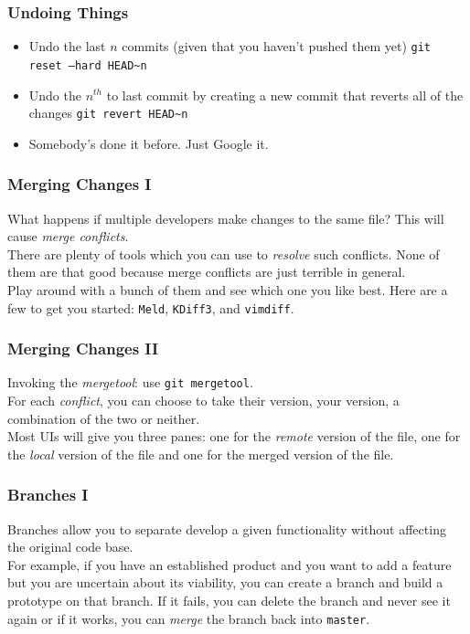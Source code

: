 \documentclass{lug}
\begin{document}
\begin{frame}
    \frametitle{Undoing Things}

    \begin{itemize}
        \item Undo the last $n$ commits (given that you haven't pushed them yet)
            \texttt{git reset --hard HEAD\textasciitilde n}
        \item Undo the $n^{th}$ to last commit by creating a new commit that
            reverts all of the changes \texttt{git revert HEAD\textasciitilde n}
        \item Somebody's done it before. Just Google it.
    \end{itemize}
\end{frame}

\begin{frame}
    \frametitle{Merging Changes I}

    What happens if multiple developers make changes to the same file? This will
    cause \textit{merge conflicts}.\\

    There are plenty of tools which you can use to \textit{resolve} such
    conflicts. None of them are that good because merge conflicts are just
    terrible in general.\\

    Play around with a bunch of them and see which one you like best. Here are a
    few to get you started: \texttt{Meld}, \texttt{KDiff3}, and
    \texttt{vimdiff}.\\
\end{frame}

\begin{frame}
    \frametitle{Merging Changes II}

    Invoking the \textit{mergetool}: use \texttt{git mergetool}.\\

    For each \textit{conflict}, you can choose to take their version, your
    version, a combination of the two or neither.\\

    Most UIs will give you three panes: one for the \textit{remote} version of
    the file, one for the \textit{local} version of the file and one for the
    merged version of the file.

\end{frame}

\begin{frame}
    \frametitle{Branches I}

    Branches allow you to separate develop a given functionality without
    affecting the original code base.\\

    For example, if you have an established product and you want to add a
    feature but you are uncertain about its viability, you can create a branch
    and build a prototype on that branch. If it fails, you can delete the branch
    and never see it again or if it works, you can \textit{merge} the branch
    back into \texttt{master}.
\end{frame}
\end{document}
